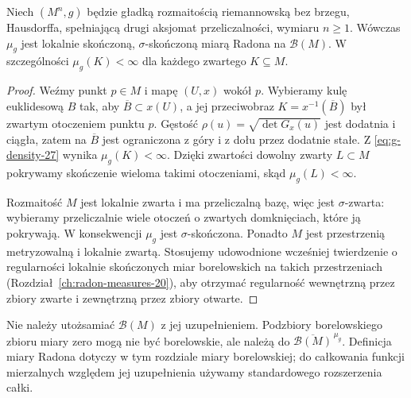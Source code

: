 \begin{twierdzenie}
\label{thm:riemann-radon-27}
Niech $(M^n,g)$ będzie gładką rozmaitością riemannowską
bez brzegu, Hausdorffa, spełniającą drugi aksjomat przeliczalności,
wymiaru $n\ge1$. Wówczas
$\mu_g$ jest lokalnie skończoną, $\sigma$-skończoną
miarą Radona na $\mathcal B(M)$. W szczególności
$\mu_g(K)<\infty$ dla każdego zwartego $K\subseteq M$.
\end{twierdzenie}
\begin{proof}
Weźmy punkt $p\in M$ i mapę $(U,x)$ wokół $p$.
Wybieramy kulę euklidesową $B$ tak, aby
$\overline B\subset x(U)$, a jej przeciwobraz $K=x^{-1}(\overline B)$
był zwartym otoczeniem punktu $p$. Gęstość
$\rho(u)=\sqrt{\det G_x(u)}$ jest dodatnia
i ciągła, zatem na $\overline B$ jest ograniczona
z góry i z dołu przez dodatnie stałe. Z
\eqref{eq:g-density-27} wynika $\mu_g(K)<\infty$.
Dzięki zwartości dowolny zwarty $L\subset M$ pokrywamy
skończenie wieloma takimi otoczeniami, skąd
$\mu_g(L)<\infty$.

Rozmaitość $M$ jest lokalnie zwarta i ma przeliczalną
bazę, więc jest $\sigma$-zwarta: wybieramy
przeliczalnie wiele otoczeń o zwartych domknięciach,
które ją pokrywają. W konsekwencji $\mu_g$ jest
$\sigma$-skończona. Ponadto $M$ jest przestrzenią
metryzowalną i lokalnie zwartą. Stosujemy
udowodnione wcześniej twierdzenie o regularności
lokalnie skończonych miar borelowskich na takich
przestrzeniach (Rozdział~\ref{ch:radon-measures-20}),
aby otrzymać regularność wewnętrzną przez zbiory
zwarte i zewnętrzną przez zbiory otwarte.
\end{proof}

\begin{uwaga}
Nie należy utożsamiać $\mathcal B(M)$ z jej
uzupełnieniem. Podzbiory borelowskiego zbioru
miary zero mogą nie być borelowskie, ale należą do
$\overline{\mathcal B(M)}^{\,\mu_g}$.
Definicja miary Radona dotyczy w tym rozdziale
miary borelowskiej; do całkowania funkcji
mierzalnych względem jej uzupełnienia używamy
standardowego rozszerzenia całki.
\end{uwaga}

